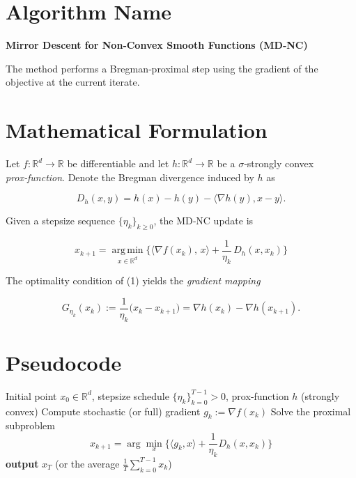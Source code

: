 \documentclass{article}
\newcommand{\Breg}[2]{D_{h}(#1,#2)}
\newcommand{\grad}{\nabla}
\begin{document}
\section*{Algorithm Name}
\textbf{Mirror Descent for Non‑Convex Smooth Functions (MD‑NC)}  

The method performs a Bregman‑proximal step using the gradient of the objective at the current iterate.

\section*{Mathematical Formulation}
Let $f:\mathbb{R}^{d}\rightarrow\mathbb{R}$ be differentiable and let $h:\mathbb{R}^{d}\rightarrow\mathbb{R}$ be a $\sigma$‑strongly convex \emph{prox‑function}.  
Denote the Bregman divergence induced by $h$ as  

\[
\Breg{x}{y}=h(x)-h(y)-\langle\nabla h(y),x-y\rangle .
\]

Given a stepsize sequence $\{\eta_k\}_{k\ge 0}$, the MD‑NC update is  

\[
\boxed{
x_{k+1}= \operatorname*{arg\,min}_{x\in\mathbb{R}^{d}}
\Big\{ \langle \grad f(x_k),\,x\rangle + \frac{1}{\eta_k}\,\Breg{x}{x_k}\Big\}
}
\tag{1}
\]

The optimality condition of (1) yields the \emph{gradient mapping}  

\[
G_{\eta_k}(x_k):=\frac{1}{\eta_k}\bigl(x_k-x_{k+1}\bigr)
          =\nabla h(x_k)-\nabla h(x_{k+1}) .
\tag{2}
\]

\section*{Pseudocode}
\begin{algorithm}[H]
\caption{Mirror Descent for Non‑Convex Smooth Functions}
\begin{algorithmic}[1]
\Require Initial point $x_0\in\mathbb{R}^{d}$, stepsize schedule $\{\eta_k\}_{k=0}^{T-1}>0$, prox‑function $h$ (strongly convex)
    \State Compute stochastic (or full) gradient $g_k:=\grad f(x_k)$
    \State Solve the proximal subproblem  
    \[
    x_{k+1}= \arg\min_{x}\Big\{\langle g_k,x\rangle+\frac{1}{\eta_k}\Breg{x}{x_k}\Big\}
    \]
\EndFor
\State \textbf{output} $x_T$ (or the average $\frac1T\sum_{k=0}^{T-1}x_k$)
\end{algorithmic}
\end{algorithm}
\end{document}
